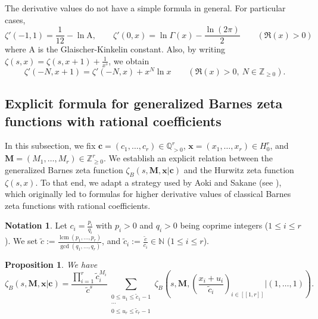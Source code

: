 \documentclass[a4paper]{amsart}
\newtheorem{proposition}[theorem]{Proposition}
\theoremstyle{remark}
\theoremstyle{definition}
\newtheorem*{notation}{Notation}
\DeclareMathOperator{\ppcm}{lcm}
\DeclareMathOperator{\pgcd}{gcd}
\newcommand{\glaisher}{\mathrm{A}}
\begin{document}
The derivative values do not have a simple formula in general. For particular cases,
$$ \zeta'(-1,1) = \frac{1}{12}-\ln \glaisher, \qquad \zeta'(0,x) = \ln \Gamma(x)-\frac{\ln(2\pi)}{2} \qquad (\Re(x)>0) $$
where $\glaisher$ is the Glaischer-Kinkelin constant. Also, by writing $\zeta(s,x)=\zeta(s,x+1)+\frac{1}{x^s}$, we obtain
\begin{equation}
    \zeta'(-N,x+1)=\zeta'(-N,x)+x^N \ln x \qquad (\Re(x)>0, \ N \in \mathbb{Z}_{\geq 0}). \label{eq:relation_prime_zeta_hurwitz_x_1}
\end{equation}

\subsection{Explicit formula for generalized Barnes zeta functions with rational coefficients}
\label{subsection:generalized_barnes_formula}

In this subsection, we fix $\mathbf{c}=(c_1,\ldots,c_{r}) \in \mathbb{Q}_{>0}^r$, $\mathbf{x}=(x_1,\ldots,x_r) \in H_0^r$, and $\mathbf{M}=(M_1,\ldots,M_{r}) \in \mathbb{Z}_{\geq 0}^r$. We establish an explicit relation between the generalized Barnes zeta function $\zeta_B(s,\mathbf{M},\mathbf{x}|\mathbf{c})$ and the Hurwitz zeta function $\zeta(s,x)$. To that end, we adapt a strategy used by Aoki and Sakane (see \cite{sakane2022values}), which originally led to formulas for higher derivative values of classical Barnes zeta functions with rational coefficients.

\begin{notation}
Let $c_i=\frac{p_i}{q_i}$ with $p_i>0$ and $q_i>0$ being coprime integers ($1 \leq i \leq r$). We set $\tilde{c}:=\frac{\ppcm(p_1,\ldots,p_r)}{\pgcd(q_1,\ldots,q_r)}$, and $\tilde{c}_i := \frac{\tilde{c}}{c_i} \in \mathbb{N}$ ($1 \leq i \leq r$).
\end{notation}

\begin{proposition}
We have
\begin{equation}
    \zeta_B(s,\mathbf{M},\mathbf{x}|\mathbf{c}) = \frac{\prod_{i=1}^r \tilde{c}_i^{M_i}}{\tilde{c}^{s}} \sum_{\substack{0 \leq u_1 \leq \tilde{c}_1-1 \\ \cdots \\ 0 \leq u_r \leq \tilde{c}_r-1}} \zeta_B\left(s,\mathbf{M},\left(\frac{x_i+u_i}{\tilde{c}_i}\right)_{i \in [\![ 1,r ]\!]} | (1,\ldots,1) \right). \label{eq:formula_zeta_barnes_s}
\end{equation}
\end{proposition}
\end{document}
